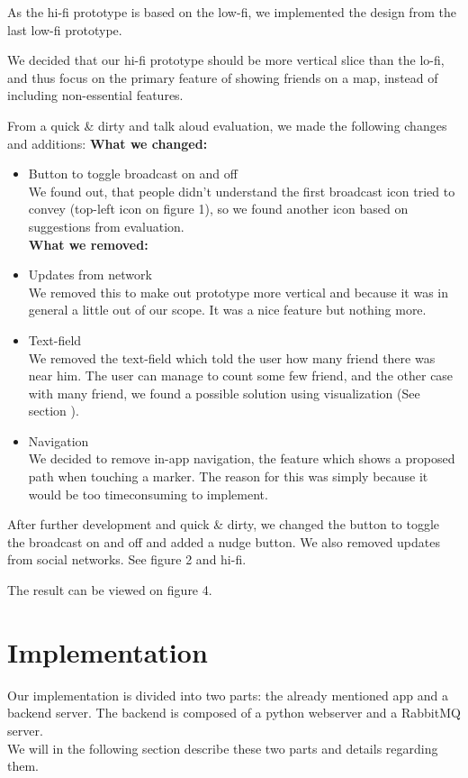 \documentclass[runningheads,a4paper]{llncs}
\begin{document}
As the hi-fi prototype is based on the low-fi, we implemented the design from the last low-fi prototype. 

We decided that our hi-fi prototype should be more vertical slice than the lo-fi, and thus focus on the primary feature of showing friends on a map, instead of including non-essential features. 

From a quick \& dirty and talk aloud evaluation, we made the following changes and additions:
\textbf{What we changed:}\begin{itemize}
\item Button to toggle broadcast on and off\\
We found out, that people didn’t understand the first broadcast icon tried to convey (top-left icon on figure 1), so we found another icon based on suggestions from evaluation. \\

\textbf{What we removed:}
\item Updates from network\\
We removed this to make out prototype more vertical and because it was in general a little out of our scope. It was a nice feature but nothing more. \\

\item Text-field\\
We removed the text-field which told the user how many friend there was near him. The user can manage to count some few friend, and the other case with many friend, we found a possible solution using visualization (See section ). \\

\item Navigation\\
We decided to remove in-app navigation, the feature which shows a proposed path when touching a marker. The reason for this was simply because it would be too timeconsuming to implement.

\end{itemize}

After further development and quick \& dirty, we changed the button to toggle the broadcast on and off and added a nudge button. We also removed updates from social networks. See figure 2 and hi-fi. 

The result can be viewed on figure 4. 

\section{Implementation}
Our implementation is divided into two parts: the already mentioned app and a backend server. The backend is composed of a python webserver and a RabbitMQ server\cite{rabbitmq}. \\
We will in the following section describe these two parts and details regarding them. 
\end{document}
